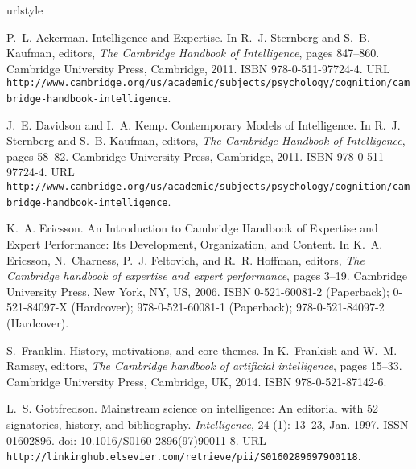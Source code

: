\begin{thebibliography}{11}
\providecommand{\natexlab}[1]{#1}
\providecommand{\url}[1]{\texttt{#1}}
\expandafter\ifx\csname urlstyle\endcsname\relax
  \providecommand{\doi}[1]{doi: #1}\else
  \providecommand{\doi}{doi: \begingroup \urlstyle{rm}\Url}\fi

P.~L. Ackerman.
\newblock Intelligence and {Expertise}.
\newblock In R.~J. Sternberg and S.~B. Kaufman, editors, \emph{The {Cambridge}
  {Handbook} of {Intelligence}}, pages 847--860. Cambridge University Press,
  Cambridge, 2011.
\newblock ISBN 978-0-511-97724-4.
\newblock URL
  \url{http://www.cambridge.org/us/academic/subjects/psychology/cognition/cambridge-handbook-intelligence}.

J.~E. Davidson and I.~A. Kemp.
\newblock Contemporary {Models} of {Intelligence}.
\newblock In R.~J. Sternberg and S.~B. Kaufman, editors, \emph{The {Cambridge}
  {Handbook} of {Intelligence}}, pages 58--82. Cambridge University Press,
  Cambridge, 2011.
\newblock ISBN 978-0-511-97724-4.
\newblock URL
  \url{http://www.cambridge.org/us/academic/subjects/psychology/cognition/cambridge-handbook-intelligence}.

K.~A. Ericsson.
\newblock An {Introduction} to {Cambridge} {Handbook} of {Expertise} and
  {Expert} {Performance}: {Its} {Development}, {Organization}, and {Content}.
\newblock In K.~A. Ericsson, N.~Charness, P.~J. Feltovich, and R.~R. Hoffman,
  editors, \emph{The {Cambridge} handbook of expertise and expert performance},
  pages 3--19. Cambridge University Press, New York, NY, US, 2006.
\newblock ISBN 0-521-60081-2 (Paperback); 0-521-84097-X (Hardcover);
  978-0-521-60081-1 (Paperback); 978-0-521-84097-2 (Hardcover).

S.~Franklin.
\newblock History, motivations, and core themes.
\newblock In K.~Frankish and W.~M. Ramsey, editors, \emph{The {Cambridge}
  handbook of artificial intelligence}, pages 15--33. Cambridge University
  Press, Cambridge, UK, 2014.
\newblock ISBN 978-0-521-87142-6.

L.~S. Gottfredson.
\newblock Mainstream science on intelligence: {An} editorial with 52
  signatories, history, and bibliography.
\newblock \emph{Intelligence}, 24 (1): 13--23, Jan. 1997.
\newblock ISSN 01602896.
\newblock \doi{10.1016/S0160-2896(97)90011-8}.
\newblock URL
  \url{http://linkinghub.elsevier.com/retrieve/pii/S0160289697900118}.


\end{thebibliography}
